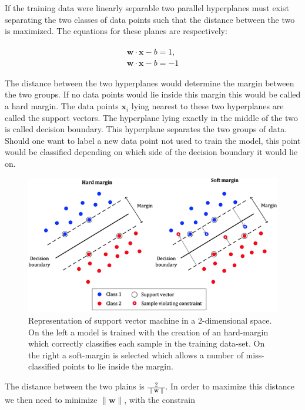If the training data were linearly separable two parallel hyperplanes must exist separating the two classes of data points such that the distance between the two is maximized. The equations for these planes are respectively:

\begin{align}
\label{eq:planes1}
	\begin{split}
	\mathbf {w}\cdot \mathbf {x}-b = 1, \\
	\mathbf {w}\cdot \mathbf {x}-b = -1
	\end{split}
\end{align}

The distance between the two hyperplanes would determine the margin between the two groups. If no data points would lie inside this margin this would be called a hard margin. The data points ${\mathbf {x}}_{i}$ lying nearest to these two hyperplanes are called the support vectors. The hyperplane lying exactly in the middle of the two is called decision boundary. This hyperplane separates the two groups of data. Should one want to label a new data point not used to train the model, this point would be classified depending on which side of the decision boundary it would lie on.

\begin{figure}[!tp]
	\centering		  
	\includegraphics[width=1.\textwidth]{figures/SVM.png}
	\caption{Representation of support vector machine in a 2-dimensional space. On the left a model is trained with the creation of an hard-margin which correctly classifies each sample in the training data-set. On the right a soft-margin is selected which allows a number of miss-classified points to lie inside the margin.}
	\label{fig:svm}
\end{figure}

The distance between the two plains is ${\frac {2}{\|{\mathbf {w}}\|}}$. In order to maximize this distance we then need to minimize $\|{\mathbf {w}}\|$, with the constrain

